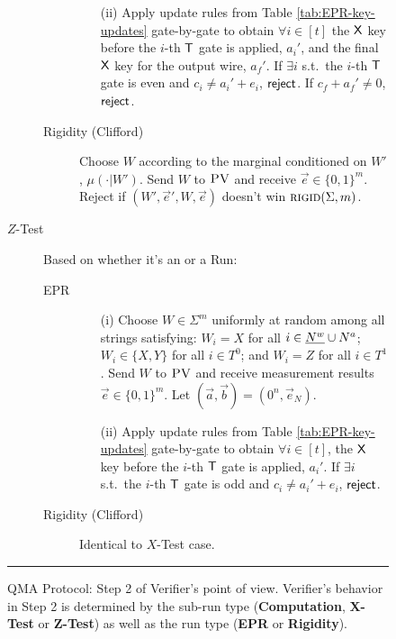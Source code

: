 \begin{figure}[H]
\begin{description}
\begin{description}
\begin{enumerate}
		\item[(ii)] Apply update rules from Table \ref{tab:EPR-key-updates} gate-by-gate to obtain $\forall i\in [t]$ the $\sf X$ key before the $i$-th $\sf T$ gate is applied, $a_i'$, and the final $\sf X$ key for the output wire, $a_f'$. 
If $\exists i$ s.t.\ the $i$-th $\sf T$ gate is even and $c_i\neq a_i'+e_i$, $\sf reject$. If $c_f+a_f'\neq 0$, $\sf reject$. 
	\end{enumerate}
	\item[Rigidity (Clifford)] Choose ${W}$ according to the marginal conditioned on ${W}'$, $\mu(\cdot|{W}')$. 
	Send ${W}$ to $\textsc{PV}$ and receive $\vec{e}\in\{0,1\}^m$. Reject if   $({W}',\vec{e}',{W},\vec{e})$ doesn't win $\textsc{rigid}(\Sigma,m)$. 
\end{description}

\item[$Z$-Test] Based on whether it's an  or a  Run:
\begin{description}
	\item[EPR] 
	\begin{enumerate}
		\item[(i)] Choose $W\in\Sigma^m$ uniformly at random among all strings
      satisfying: $W_i=X$ for all $i\in \highlight{N^w} \cup N^a$; $W_i\in\{X,Y\}$ for all $i\in T^0$; and $W_i=Z$ for all $i\in T^1$. Send $W$ to $\textsc{PV}$ and receive measurement results $\vec{e}\in\{0,1\}^m$. Let $(\vec{a},\vec{b})=(0^n,\vec{e}_N)$.
		\item[(ii)] Apply update rules from Table \ref{tab:EPR-key-updates} gate-by-gate to obtain $\forall i\in [t]$, the $\sf X$ key before the $i$-th $\sf T$ gate is applied, $a_i'$. 
If $\exists i$ s.t.\ the $i$-th $\sf T$ gate is odd and $c_i\neq a_i'+e_i$, $\sf reject$. 
	\end{enumerate}
	\item[Rigidity (Clifford)] Identical to $X$-Test case.
\end{description}
\end{description}
\rule[2ex]{\textwidth}{0.5pt}\vspace{-.5cm}
\caption{QMA Protocol: Step 2 of Verifier's point of view. Verifier's behavior in Step 2 is determined by the sub-run type (\textbf{Computation}, \textbf{X-Test} or \textbf{Z-Test}) as well as the run type (\textbf{EPR} or \textbf{Rigidity}).}\label{fig:qma-protocol-V-continued}
\end{figure}



